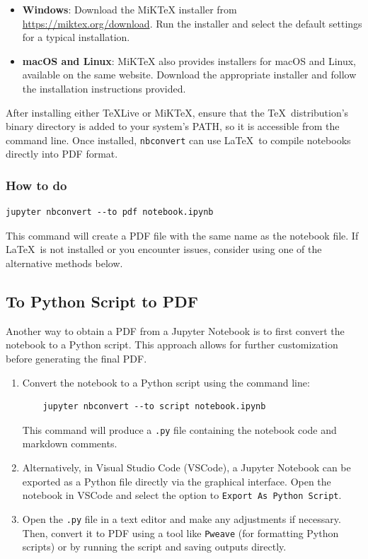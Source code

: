 \documentclass{article}
\begin{document}
\begin{itemize}
    \item \textbf{Windows}: Download the MiKTeX installer from \url{https://miktex.org/download}. Run the installer and select the default settings for a typical installation.
    
    \item \textbf{macOS and Linux}: MiKTeX also provides installers for macOS and Linux, available on the same website. Download the appropriate installer and follow the installation instructions provided.
\end{itemize}

After installing either TeXLive or MiKTeX, ensure that the \TeX~distribution’s binary directory is added to your system’s PATH, so it is accessible from the command line. Once installed, \texttt{nbconvert} can use \LaTeX~to compile notebooks directly into PDF format.


\subsubsection{How to do}

\begin{verbatim}
jupyter nbconvert --to pdf notebook.ipynb
\end{verbatim}

This command will create a PDF file with the same name as the notebook file. If \LaTeX~is not installed or you encounter issues, consider using one of the alternative methods below.



\subsection{To Python Script to PDF}

Another way to obtain a PDF from a Jupyter Notebook is to first convert the notebook to a Python script. This approach allows for further customization before generating the final PDF.

\begin{enumerate}
    \item Convert the notebook to a Python script using the command line:
    \begin{verbatim}
    jupyter nbconvert --to script notebook.ipynb
    \end{verbatim}
    This command will produce a \texttt{.py} file containing the notebook code and markdown comments.
    
    \item Alternatively, in Visual Studio Code (VSCode), a Jupyter Notebook can be exported as a Python file directly via the graphical interface. Open the notebook in VSCode and select the option to \texttt{Export As Python Script}. 

    \item Open the \texttt{.py} file in a text editor and make any adjustments if necessary. Then, convert it to PDF using a tool like \texttt{Pweave} (for formatting Python scripts) or by running the script and saving outputs directly.
\end{enumerate}
\end{document}
